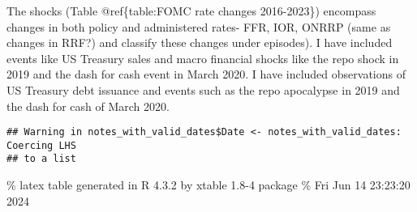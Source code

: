 \documentclass[
]{article}
\begin{document}
The shocks (Table @ref\{table:FOMC rate changes 2016-2023\}) encompass changes in both policy and administered rates- FFR, IOR, ONRRP (same as changes in RRF?) and classify these changes under episodes). I have included events like US Treasury sales and macro financial shocks like the repo shock in 2019 and the dash for cash event in March 2020. I have included observations of US Treasury debt issuance and events such as the repo apocalypse in 2019 and the dash for cash of March 2020.

\begin{verbatim}
## Warning in notes_with_valid_dates$Date <- notes_with_valid_dates: Coercing LHS
## to a list
\end{verbatim}

\% latex table generated in R 4.3.2 by xtable 1.8-4 package
\% Fri Jun 14 23:23:20 2024
\end{document}

